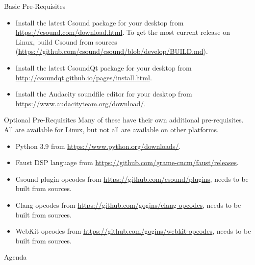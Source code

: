 \documentclass{beamer}
\begin{document}
    \begin{frame}{Basic Pre-Requisites}
        \begin{itemize}
            \item Install the latest Csound package for your desktop from
            \url{https://csound.com/download.html}. To get the most current release on
            Linux, build Csound from sources
            (\url{https://github.com/csound/csound/blob/develop/BUILD.md}).
            \item Install the latest CsoundQt package for your desktop from
            \url{http://csoundqt.github.io/pages/install.html}.
            \item Install the Audacity soundfile editor for your desktop from
            \url{https://www.audacityteam.org/download/}.
        \end{itemize}
    \end{frame}
    \begin{frame}{Optional Pre-Requisites}
        Many of these have their own additional pre-requisites. All are available
        for Linux, but not all are available on other platforms.
        \begin{itemize}
            \item Python 3.9 from \url{https://www.python.org/downloads/}.
            \item Faust DSP language from
            \url{https://github.com/grame-cncm/faust/releases}.
            \item Csound plugin opcodes from
            \url{https://github.com/csound/plugins}, needs to be built from sources.
            \item Clang opcodes from \url{https://github.com/gogins/clang-opcodes},
            needs to be built from sources.
            \item WebKit opcodes from
            \url{https://github.com/gogins/webkit-opcodes}, needs to be built from sources.
        \end{itemize}
    \end{frame}
    
    \begin{frame}{Agenda}
        \tableofcontents
    \end{frame}
    
\end{document}
